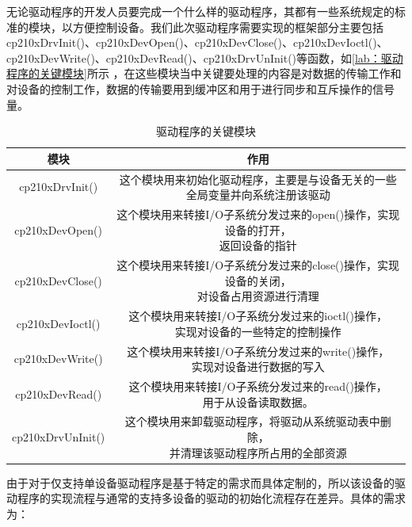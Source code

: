 	无论驱动程序的开发人员要完成一个什么样的驱动程序，其都有一些系统规定的标准的模块，以方便控制设备。我们此次驱动程序需要实现的框架部分主要包括cp210xDrvInit()、cp210xDevOpen()、cp210xDevClose()、cp210xDevIoctl()、cp210xDevWrite()、cp210xDevRead()、cp210xDrvUnInit()等函数，如\autoref{lab：驱动程序的关键模块}所示 ，在这些模块当中关键要处理的内容是对数据的传输工作和对设备的控制工作，数据的传输要用到缓冲区和用于进行同步和互斥操作的信号量。
\begin{table}[!h]
\centering
\begin{tabular}{|c|c|}
\hline
{模块} & {作用} \\
\hline
{cp210xDrvInit()} & \tabincell{c}{这个模块用来初始化驱动程序，主要是与设备无关的一些\\全局变量并向系统注册该驱动} \\
\hline
{cp210xDevOpen()} & \tabincell{c}{这个模块用来转接I/O子系统分发过来的open()操作，实现设备的打开，\\返回设备的指针} \\
\hline
{cp210xDevClose()} & \tabincell{c}{这个模块用来转接I/O子系统分发过来的close()操作，实现设备的关闭，\\对设备占用资源进行清理} \\
\hline
{cp210xDevIoctl()} & \tabincell{c}{这个模块用来转接I/O子系统分发过来的ioctl()操作，\\实现对设备的一些特定的控制操作} \\
\hline
{cp210xDevWrite()} & \tabincell{c}{这个模块用来转接I/O子系统分发过来的write()操作，\\实现对设备进行数据的写入} \\
\hline
{cp210xDevRead()} & \tabincell{c}{这个模块用来转接I/O子系统分发过来的read()操作，\\用于从设备读取数据。} \\
\hline
{cp210xDrvUnInit()} & \tabincell{c}{这个模块用来卸载驱动程序，将驱动从系统驱动表中删除，\\并清理该驱动程序所占用的全部资源} \\
\hline
\end{tabular} 
\caption{驱动程序的关键模块}\label{lab：驱动程序的关键模块}
\end{table}


	由于对于仅支持单设备驱动程序是基于特定的需求而具体定制的，所以该设备的驱动程序的实现流程与通常的支持多设备的驱动的初始化流程存在差异。具体的需求为：\\
\\

